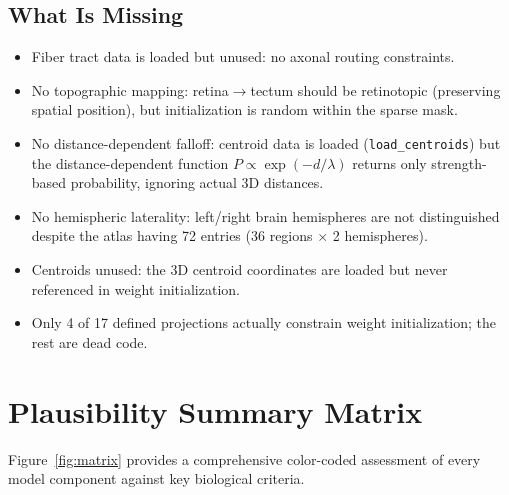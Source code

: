 \documentclass[11pt,a4paper]{article}
\begin{document}
\subsection{What Is Missing}

\begin{itemize}[leftmargin=*]
\item[\textcolor{missing}{$\times$}] Fiber tract data is loaded but unused: no
  axonal routing constraints.
\item[\textcolor{missing}{$\times$}] No topographic mapping: retina$\to$tectum
  should be retinotopic (preserving spatial position), but initialization is
  random within the sparse mask.
\item[\textcolor{missing}{$\times$}] No distance-dependent falloff: centroid data
  is loaded (\texttt{load\_centroids}) but the distance-dependent function
  $P \propto \exp(-d/\lambda)$ returns only strength-based probability, ignoring
  actual 3D distances.
\item[\textcolor{missing}{$\times$}] No hemispheric laterality: left/right brain
  hemispheres are not distinguished despite the atlas having 72 entries
  (36 regions $\times$ 2 hemispheres).
\item[\textcolor{missing}{$\times$}] Centroids unused: the 3D centroid coordinates
  are loaded but never referenced in weight initialization.
\item[\textcolor{missing}{$\times$}] Only 4 of 17 defined projections actually
  constrain weight initialization; the rest are dead code.
\end{itemize}

\section{Plausibility Summary Matrix}
\label{sec:matrix}

Figure~\ref{fig:matrix} provides a comprehensive color-coded assessment of every
model component against key biological criteria.
\end{document}
